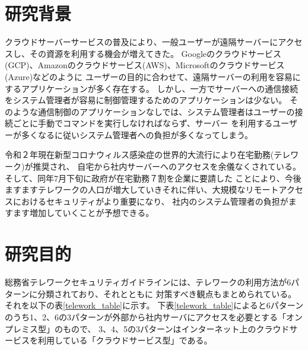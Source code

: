\documentclass[12pt,a4paper,titlepage]{jreport}
\begin{document}
\section{研究背景}
クラウドサーバーサービスの普及により、一般ユーザーが遠隔サーバーにアクセスし、その資源を利用する機会が増えてきた。
Googleのクラウドサービス(GCP)、Amazonのクラウドサービス(AWS)、Microsoftのクラウドサービス(Azure)などのように
ユーザーの目的に合わせて、遠隔サーバーの利用を容易にするアプリケーションが多く存在する。
しかし、一方でサーバーへの通信接続をシステム管理者が容易に制御管理するためのアプリケーションは少ない。
そのような通信制御のアプリケーションなしでは、システム管理者はユーザーの接続ごとに手動でコマンドを実行しなければならず、サーバー
を利用するユーザーが多くなるに従いシステム管理者への負担が多くなってしまう。\par
令和２年現在新型コロナウィルス感染症の世界的大流行により在宅勤務(テレワーク)が推奨され、
自宅から社内サーバーへのアクセスを余儀なくされている。そして、同年7月下旬に政府が在宅勤務７割を企業に要請した\cite{covid_nikkei}
ことにより、今後ますますテレワークの人口が増大していきそれに伴い、大規模なリモートアクセスにおけるセキュリティがより重要になり、
社内のシステム管理者の負担がますます増加していくことが予想できる。\par 









\section{研究目的}


総務省テレワークセキュリティガイドラインには、テレワークの利用方法が6パターンに分類されており、それとともに
対策すべき観点もまとめられている。\cite{telework_guideline}それを以下の表\ref{telework_table}に示す。
下表\ref{telework_table}によると6パターンのうち1、2、6の3パターンが外部から社内サーバにアクセスを必要とする「オンプレミス型」のもので、
3、4、5の3パターンはインターネット上のクラウドサービスを利用している「クラウドサービス型」である。
\end{document}

